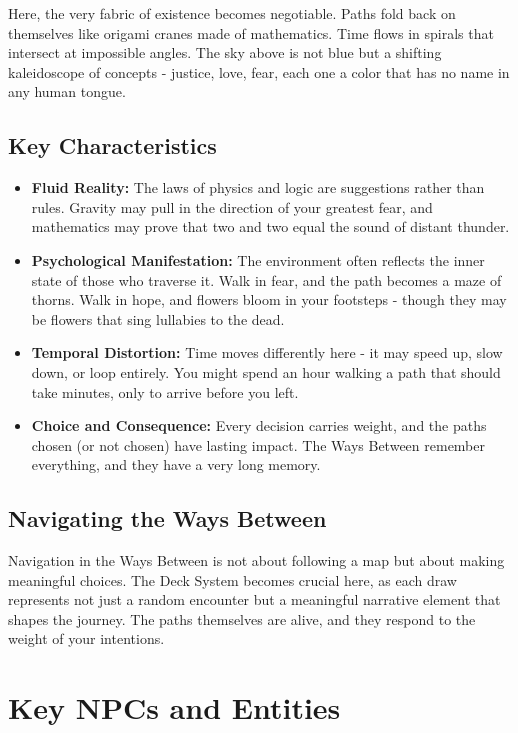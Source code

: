 \documentclass[11pt]{article}
\begin{document}
Here, the very fabric of existence becomes negotiable. Paths fold back on themselves like origami cranes made of mathematics. Time flows in spirals that intersect at impossible angles. The sky above is not blue but a shifting kaleidoscope of concepts - justice, love, fear, each one a color that has no name in any human tongue.

\subsection{Key Characteristics}

\begin{itemize}
\item \textbf{Fluid Reality:} The laws of physics and logic are suggestions rather than rules. Gravity may pull in the direction of your greatest fear, and mathematics may prove that two and two equal the sound of distant thunder.
\item \textbf{Psychological Manifestation:} The environment often reflects the inner state of those who traverse it. Walk in fear, and the path becomes a maze of thorns. Walk in hope, and flowers bloom in your footsteps - though they may be flowers that sing lullabies to the dead.
\item \textbf{Temporal Distortion:} Time moves differently here - it may speed up, slow down, or loop entirely. You might spend an hour walking a path that should take minutes, only to arrive before you left.
\item \textbf{Choice and Consequence:} Every decision carries weight, and the paths chosen (or not chosen) have lasting impact. The Ways Between remember everything, and they have a very long memory.
\end{itemize}

\subsection{Navigating the Ways Between}

Navigation in the Ways Between is not about following a map but about making meaningful choices. The Deck System becomes crucial here, as each draw represents not just a random encounter but a meaningful narrative element that shapes the journey. The paths themselves are alive, and they respond to the weight of your intentions.

\section{Key NPCs and Entities}
\end{document}
